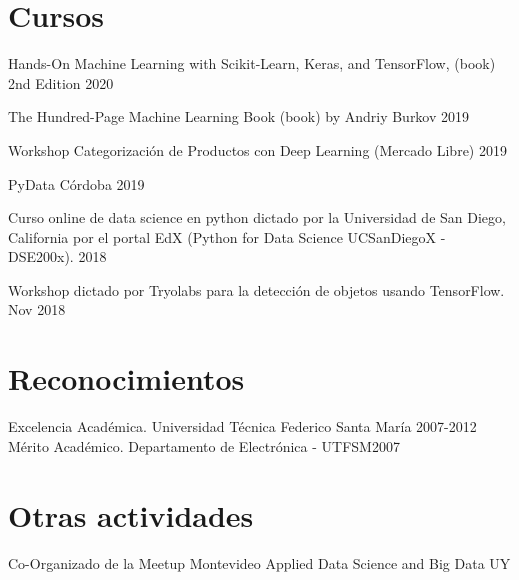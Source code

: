 \documentclass{article}
\renewenvironment{itemize}[1]{\begin{compactitem}#1}{\end{compactitem}}
\begin{document}
	\section{Cursos}
	\begin{itemize}[-]
		\item Hands-On Machine Learning with Scikit-Learn, Keras, and TensorFlow, (book) 2nd Edition \hfill 2020
		\item The Hundred-Page Machine Learning Book (book) by Andriy Burkov \hfill 2019   

		\item Workshop Categorización de Productos con Deep Learning (Mercado Libre) \hfill 2019
		\item PyData Córdoba \hfill 2019
		\item Curso online de data science en python dictado por la Universidad de San Diego, California por el portal EdX (Python for Data Science UCSanDiegoX - DSE200x). \hfill 2018
		\item  Workshop dictado por Tryolabs para la detección de objetos usando TensorFlow.  \hfill Nov 2018

	\end{itemize}

	\section{Reconocimientos}
	
	\ralewaysb Excelencia Académica. \raleway Universidad Técnica Federico Santa María \hfill 2007-2012
	\ralewaysb Mérito Académico. \raleway Departamento de Electrónica - UTFSM\hfill 2007
	
	\section{Otras actividades}
	Co-Organizado de la Meetup Montevideo Applied Data Science and Big Data UY
\end{document}
